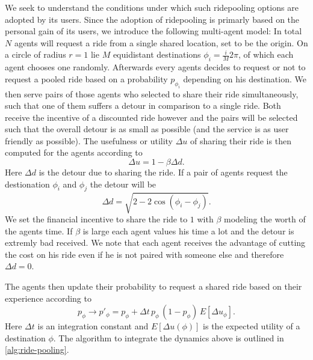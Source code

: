 \documentclass[aps,pra,showpacs,preprintnumbers,amsmath,amssymb,nofootinbib]{revtex4-2}
\begin{document}
    We seek to understand the conditions under which such ridepooling options are adopted by its users.
    Since the adoption of ridepooling is primarly based on the personal gain of its users, we introduce the following multi-agent model\cite{SC22}:
    In total $N$ agents will request a ride from a single shared location, set to be the origin. 
    On a circle of radius $r = 1$ lie $M$ equidistant destinations $\phi_i = \frac{i}{M} 2\pi$, of which each agent chooses one randomly. 
    Afterwards every agents decides to request or not to request a pooled ride based on a probability $p_{\phi_i}$ depending on his destination.
    We then serve pairs of those agents who selected to share their ride simultaneously, such that one of them suffers a detour in comparison to a single ride.
    Both receive the incentive of a discounted ride however and the pairs will be selected such that the overall detour is as small as possible (and the service is as user friendly as possible).
    The usefulness or utility $\Delta u$ of sharing their ride is then computed for the agents according to \[\Delta u  = 1 - \beta \Delta d.\]
    Here $\Delta d$ is the detour due to sharing the ride.
    If a pair of agents request the destionation $\phi_i$ and $\phi_j$ the detour will be \[\Delta d = \sqrt{2 - 2 \cos (\phi_i - \phi_j)}.\] 
    We set the financial incentive to share the ride to $1$ with $\beta$ modeling the worth of the agents time.
    If $\beta$ is large each agent values his time a lot and the detour is extremly bad received.
    We note that each agent receives the advantage of cutting the cost on his ride even if he is not paired with someone else and therefore $\Delta d = 0$.

    The agents then update their probability to request a shared ride based on their experience according to \[p^{\phantom{'}}_\phi\rightarrow p'_\phi = p_\phi + \Delta t \,p^{\phantom{'}}_\phi\, (1- p^{\phantom{'}}_\phi)\, E[\Delta u^{\phantom{'}}_\phi].\]
    Here $\Delta t$ is an integration constant and $E[\Delta u(\phi)]$ is the expected utility of a destination $\phi$.
    The algorithm to integrate the dynamics above is outlined in \cref{alg:ride-pooling}.
\end{document}
